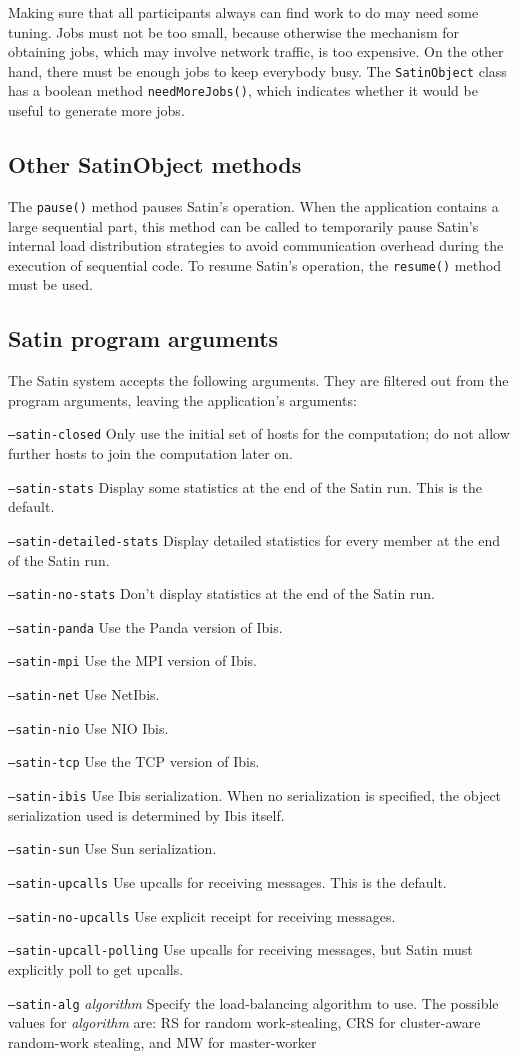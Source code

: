 \documentclass[10pt]{article}
\newcommand{\mysubsection}[1]{\subsection{#1}\label{#1}}
\begin{document}
Making sure that all participants always can find work to do may need
some tuning. Jobs must not be too small, because otherwise the mechanism
for obtaining jobs, which may involve network traffic, is too expensive.
On the other hand, there must be enough jobs to keep everybody busy.
The \texttt{SatinObject} class has a boolean method \texttt{needMoreJobs()},
which indicates whether it would be useful to generate more jobs.

\mysubsection{Other SatinObject methods}

The \texttt{pause()} method pauses Satin's operation. When the application
contains a large sequential part, this method can be called to temporarily
pause Satin's internal load distribution strategies to avoid communication
overhead during the execution of sequential code.
To resume Satin's operation, the \texttt{resume()} method must be used.

\mysubsection{Satin program arguments}

The Satin system accepts the following arguments. They are
filtered out from the program arguments, leaving the application's
arguments:
\begin{description}
\item{\texttt{--satin-closed}}
Only use the initial set of hosts for the computation; do not allow
further hosts to join the computation later on.
\item{\texttt{--satin-stats}}
Display some statistics at the end of the Satin run. This is the default.
\item{\texttt{--satin-detailed-stats}}
Display detailed statistics for every member at the end of the Satin run.
\item{\texttt{--satin-no-stats}}
Don't display statistics at the end of the Satin run.
\item{\texttt{--satin-panda}}
Use the Panda version of Ibis.
\item{\texttt{--satin-mpi}}
Use the MPI version of Ibis.
\item{\texttt{--satin-net}}
Use NetIbis.
\item{\texttt{--satin-nio}}
Use NIO Ibis.
\item{\texttt{--satin-tcp}}
Use the TCP version of Ibis.
\item{\texttt{--satin-ibis}}
Use Ibis serialization. When no serialization is specified,
the object serialization used is determined by Ibis itself.
\item{\texttt{--satin-sun}}
Use Sun serialization.
\item{\texttt{--satin-upcalls}}
Use upcalls for receiving messages. This is the default.
\item{\texttt{--satin-no-upcalls}}
Use explicit receipt for receiving messages.
\item{\texttt{--satin-upcall-polling}}
Use upcalls for receiving messages, but Satin must explicitly poll to get
upcalls.
\item{\texttt{--satin-alg} \emph{algorithm}}
Specify the load-balancing algorithm to use. The possible values for
\emph{algorithm} are: RS for random work-stealing, CRS for cluster-aware
random-work stealing, and MW for master-worker
\end{description}
\end{document}
